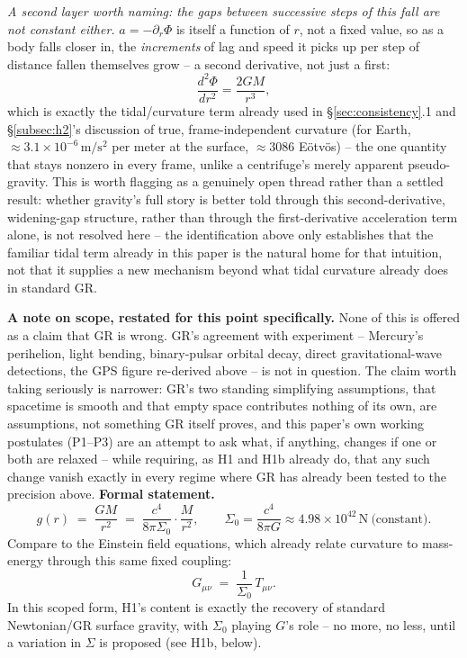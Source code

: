 \documentclass[12pt, a4paper]{article}
\begin{document}
\emph{A second layer worth naming: the gaps between successive steps
of this fall are not constant either.} $a=-\partial_r\Phi$ is itself a
function of $r$, not a fixed value, so as a body falls closer in, the
\emph{increments} of lag and speed it picks up per step of distance
fallen themselves grow -- a second derivative, not just a first:
\begin{equation}
\frac{d^2\Phi}{dr^2} = \frac{2GM}{r^3},
\end{equation}
which is exactly the tidal/curvature term already used in
\S\ref{sec:consistency}.1 and \S\ref{subsec:h2}'s discussion of true,
frame-independent curvature (for Earth, $\approx3.1\times10^{-6}
\,\mathrm{m/s^2}$ per meter at the surface, $\approx3086$ Eötvös) --
the one quantity that stays nonzero in every frame, unlike a
centrifuge's merely apparent pseudo-gravity. This is worth flagging
as a genuinely open thread rather than a settled result: whether
gravity's full story is better told through this second-derivative,
widening-gap structure, rather than through the first-derivative
acceleration term alone, is not resolved here -- the identification
above only establishes that the familiar tidal term already in this
paper is the natural home for that intuition, not that it supplies a
new mechanism beyond what tidal curvature already does in standard
GR.

\textbf{A note on scope, restated for this point specifically.} None
of this is offered as a claim that GR is wrong. GR's agreement with
experiment -- Mercury's perihelion, light bending, binary-pulsar
orbital decay, direct gravitational-wave detections, the GPS figure
re-derived above -- is not in question. The claim worth taking
seriously is narrower: GR's two standing simplifying assumptions,
that spacetime is smooth and that empty space contributes nothing of
its own, are assumptions, not something GR itself proves, and this
paper's own working postulates (P1--P3) are an attempt to ask what, if
anything, changes if one or both are relaxed -- while requiring, as
H1 and H1b already do, that any such change vanish exactly in every
regime where GR has already been tested to the precision above.
\textbf{Formal statement.}
\begin{equation}
g(r) \;=\; \frac{GM}{r^2} \;=\; \frac{c^4}{8\pi\Sigma_0}\cdot\frac{M}{r^2},
\qquad \Sigma_0 = \frac{c^4}{8\pi G} \approx 4.98\times10^{42}\,\mathrm{N}
\ \text{(constant)}.
\end{equation}
Compare to the Einstein field equations, which already relate
curvature to mass-energy through this same fixed coupling:
\begin{equation}
G_{\mu\nu} \;=\; \frac{1}{\Sigma_0}\,T_{\mu\nu}.
\end{equation}
In this scoped form, H1's content is exactly the recovery of standard
Newtonian/GR surface gravity, with $\Sigma_0$ playing $G$'s role --
no more, no less, until a variation in $\Sigma$ is proposed (see H1b,
below).
\end{document}
